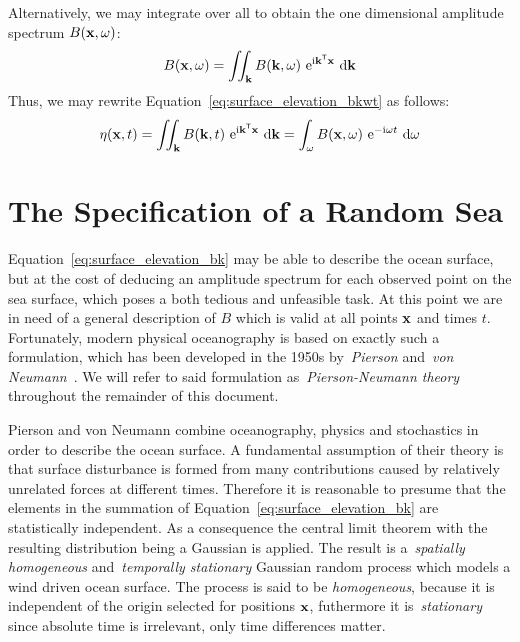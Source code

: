%
Alternatively, we may integrate over all \wavenumbers to obtain the one dimensional
amplitude spectrum $B(\mathbf{x}, \omega)$:
%
\begin{equation}
 B(\mathbf{x}, \omega) = \iint_{\mathbf{k}} B(\mathbf{k},
\omega)~\mathrm{e}^{\mathrm{i}\mathbf{k}^{\mathsf{T}}\mathbf{x}}~\mathrm{d}\mathbf{k}
\end{equation}
%
Thus, we may rewrite Equation~\ref{eq:surface_elevation_bkwt} as follows:
%
\begin{equation}
\label{eq:surface_elevation_bk}
  \eta(\mathbf{x}, t) = \iint_{\mathbf{k}} B(\mathbf{k},t)~\mathrm{e}^{\mathrm{i}\mathbf{k}^{\mathsf{T}}\mathbf{x}}~\mathrm{d}\mathbf{k}
  = \int_{\omega} B(\mathbf{x},\omega)~\mathrm{e}^{-\mathrm{i}\omega t}~\mathrm{d}\omega
\end{equation}
%
%
\section{The Specification of a Random Sea}
\label{sec:random_sea}
%
Equation~\ref{eq:surface_elevation_bk} may be able to describe the ocean
surface, but at the cost of deducing an amplitude spectrum for each observed
point on the sea surface, which poses a both tedious and unfeasible task. At
this point we are in need of a general description of $B$ which is valid at all
points $\mathbf{x}$ and times $t$. Fortunately, modern physical oceanography is
based on exactly such a formulation, which has been developed in the 1950s
by~\emph{Pierson} and~\emph{von Neumann}~\citep{Neumann:1966}. We will refer to
said formulation as~\emph{Pierson-Neumann theory} throughout the remainder of
this document.

Pierson and von Neumann combine oceanography, physics and stochastics in order
to describe the ocean surface. A fundamental assumption of their theory is that
surface disturbance is formed from many contributions caused by relatively
unrelated forces at different times. Therefore it is reasonable to presume that
the elements in the summation of Equation~\ref{eq:surface_elevation_bk} are
statistically independent. As a consequence the central limit theorem with the
resulting distribution being a Gaussian is applied. The result is
a~\emph{spatially homogeneous} and~\emph{temporally stationary} Gaussian random
process which models a wind driven ocean surface. The process is said to be
\emph{homogeneous}, because it is independent of the origin selected for
positions $\mathbf{x}$, futhermore it is~\emph{stationary} since absolute time is
irrelevant, only time differences matter.
%

